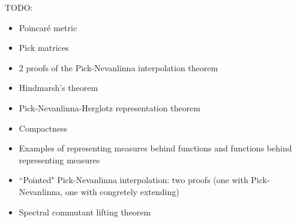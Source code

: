 TODO:
\begin{itemize}
	\item Poincaré metric
	\item Pick matrices
	\item 2 proofs of the Pick-Nevanlinna interpolation theorem
	\item Hindmarsh's theorem
	\item Pick-Nevanlinna-Herglotz representation theorem
	\item Compactness
	\item Examples of representing measures behind functions and functions behind representing measures
	\item ``Pointed" Pick-Nevanlinna interpolation: two proofs (one with Pick-Nevanlinna, one with congretely extending)
	\item Spectral commutant lifting theorem
\end{itemize}

